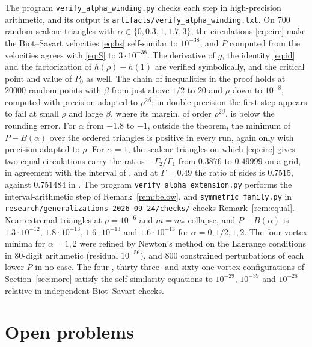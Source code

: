 \documentclass[11pt]{article}
\theoremstyle{definition}
\begin{document}
The program \texttt{verify\_alpha\_winding.py} checks each step in high-precision arithmetic, and its output is \texttt{artifacts/verify\_alpha\_winding.txt}. On 700 random scalene triangles with $\alpha \in \{0, 0.3, 1, 1.7, 3\}$, the circulations \eqref{eq:circ} make the Biot--Savart velocities \eqref{eq:bs} self-similar to $10^{-38}$, and $P$ computed from the velocities agrees with \eqref{eq:S} to $3\cdot 10^{-38}$. The derivative of $g$, the identity \eqref{eq:id} and the factorization of $h(\rho) - h(1)$ are verified symbolically, and the critical point and value of $P_0$ as well. The chain of inequalities in the proof holds at $20000$ random points with $\beta$ from just above $1/2$ to $20$ and $\rho$ down to $10^{-8}$, computed with precision adapted to $\rho^{2\beta}$; in double precision the first step appears to fail at small $\rho$ and large $\beta$, where its margin, of order $\rho^{2\beta}$, is below the rounding error. For $\alpha$ from $-1.8$ to $-1$, outside the theorem, the minimum of $P - B(\alpha)$ over the ordered triangles is positive in every run, again only with precision adapted to $\rho$. For $\alpha = 1$, the scalene triangles on which \eqref{eq:circ} gives two equal circulations carry the ratios $-\Gamma_2/\Gamma_1$ from $0.3876$ to $0.49999$ on a grid, in agreement with the interval of \cite[Lemma~1]{bb2018}, and at $\Gamma = 0.49$ the ratio of sides is $0.7515$, against $0.751484$ in \cite{bb2018}. The program \texttt{verify\_alpha\_extension.py} performs the interval-arithmetic step of Remark~\ref{rem:below}, and \texttt{symmetric\_family.py} in \texttt{research/generalizations-2026-09-24/checks/} checks Remark~\ref{rem:equal}. Near-extremal triangles at $\rho = 10^{-6}$ and $m = m_*$ collapse, and $P - B(\alpha)$ is $1.3\cdot 10^{-12}$, $1.8\cdot 10^{-13}$, $1.6\cdot 10^{-13}$ and $1.6\cdot 10^{-13}$ for $\alpha = 0, 1/2, 1, 2$. The four-vortex minima for $\alpha = 1, 2$ were refined by Newton's method on the Lagrange conditions in 80-digit arithmetic (residual $10^{-56}$), and 800 constrained perturbations of each lower $P$ in no case. The four-, thirty-three- and sixty-one-vortex configurations of Section~\ref{sec:more} satisfy the self-similarity equations to $10^{-29}$, $10^{-39}$ and $10^{-28}$ relative in independent Biot--Savart checks.

\section{Open problems}
\end{document}
